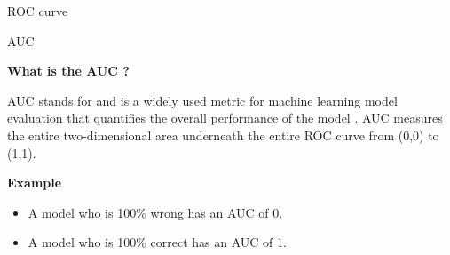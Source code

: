 \begin{frame}{ROC curve}
    
        
\end{frame}


\begin{frame}{AUC}
    
    {\large\textbf{What is the AUC ?}}
    
    AUC stands for  and is a widely used metric for machine learning model evaluation that quantifies the overall performance of the model . AUC measures the entire two-dimensional area underneath the entire ROC curve from (0,0) to (1,1). 
    
    {\large\textbf{Example}}
    \begin{itemize}
    	\item A model who is 100\% wrong has an AUC of 0.
    	\item A model who is 100\% correct has an AUC of 1.
    
    \end{itemize}
    
\end{frame}


